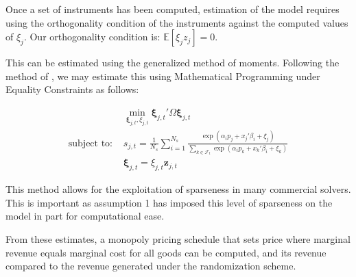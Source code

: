 \documentclass[12pt]{paper}
\newcommand{\exV}[1]{\mathbb{E} \left [ #1 \right ]}
\begin{document}
Once a set of instruments has been computed, estimation of the model
requires using the orthogonality condition of the instruments against
the computed values of $\xi_j$. Our orthogonality condition is:
$\exV{\xi_j z_j} = 0$.

This can be estimated using the generalized method of
moments. Following the method of \cite*{MPEC}, we may estimate
this using Mathematical Programming under Equality Constraints as
follows: 

\begin{align}
  &\min_{\bm{\xi}_{j,t}, \xi_{j,t}} \bm{\xi}_{j,t}' \Omega \bm{\xi}_{j,t}\\
    \text{subject to: } &s_{j,t} = \frac{1}{N_s} \sum_{i=1}^{N_s}
                          \frac{\exp(\alpha_i p_j + x_j'\beta_i + \xi_j)}{\sum_{k\in
                          \mathcal{F}_t} \exp( \alpha_i p_k + x_k'\beta_i +
                          \xi_k)}\\
  &\bm{\xi}_{j,t} = \xi_{j,t} \bm{z}_{j,t}  
\end{align}

This  method allows for the exploitation of sparseness in many
commercial solvers. This is important as assumption 1 has imposed this
level of sparseness on the model in part for computational ease.

From these estimates, a monopoly pricing schedule that sets price
where marginal revenue equals marginal cost for all goods can be
computed, and its revenue compared to the revenue generated under the
randomization scheme.



{}
\end{document}
